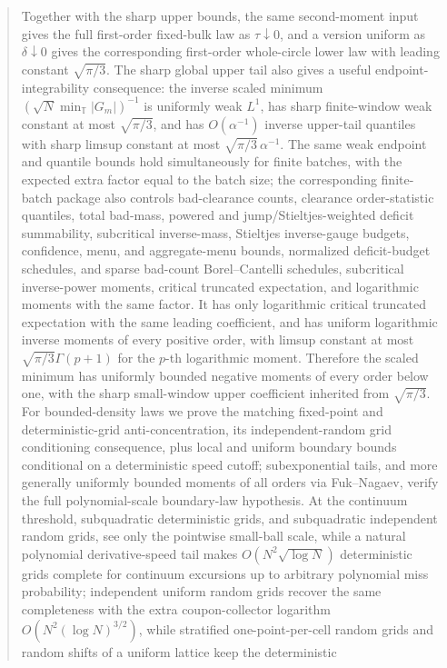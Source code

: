 \documentclass[11pt]{amsart}
\numberwithin{equation}{section}
\theoremstyle{definition}
\theoremstyle{remark}
\newcommand{\T}{\mathbb T}
\begin{document}
\begin{abstract}
Together with the sharp upper bounds, the same second-moment input gives the
full first-order fixed-bulk law as \(\tau\downarrow0\), and a version uniform as
\(\delta\downarrow0\) gives the corresponding first-order whole-circle lower
law with leading constant \(\sqrt{\pi/3}\).  The sharp global upper tail also
gives a useful endpoint-integrability consequence: the inverse scaled minimum
\((\sqrt N\min_{\T}|G_m|)^{-1}\) is uniformly weak \(L^1\), has sharp
finite-window weak constant at most \(\sqrt{\pi/3}\), and has
\(O(\alpha^{-1})\) inverse upper-tail quantiles with sharp limsup constant
at most \(\sqrt{\pi/3}\,\alpha^{-1}\).  The same weak endpoint and quantile
bounds hold simultaneously for finite batches, with the expected extra factor
equal to the batch size; the corresponding finite-batch package also controls
bad-clearance counts, clearance order-statistic quantiles, total bad-mass,
powered and jump/Stieltjes-weighted deficit summability, subcritical inverse-mass,
Stieltjes inverse-gauge budgets, confidence, menu, and aggregate-menu bounds,
normalized deficit-budget schedules, and sparse bad-count Borel--Cantelli schedules,
subcritical inverse-power moments, critical truncated
expectation, and logarithmic moments with the same factor.  It has only
logarithmic critical truncated expectation with the same leading coefficient,
and has uniform logarithmic inverse moments of every positive order, with
limsup constant at most \(\sqrt{\pi/3}\Gamma(p+1)\) for the \(p\)-th
logarithmic moment.
Therefore the scaled minimum has uniformly bounded negative moments
of every order below one, with the sharp small-window upper coefficient
inherited from \(\sqrt{\pi/3}\).
For bounded-density laws we
prove the matching fixed-point and deterministic-grid anti-concentration, its
independent-random grid conditioning consequence, plus local and uniform
boundary bounds conditional on a deterministic speed cutoff;
subexponential tails, and more generally uniformly bounded moments of all
orders via Fuk--Nagaev, verify the full polynomial-scale boundary-law
hypothesis. At the continuum threshold, subquadratic deterministic grids, and
subquadratic independent random grids, see only the pointwise small-ball scale,
while a natural polynomial derivative-speed tail makes \(O(N^2\sqrt{\log N})\)
deterministic grids complete for continuum excursions up to arbitrary
polynomial miss probability; independent uniform random grids recover the same
completeness with the extra coupon-collector logarithm
\(O(N^2(\log N)^{3/2})\), while stratified one-point-per-cell random grids and
random shifts of a uniform lattice keep the deterministic

\end{abstract}
\end{document}
